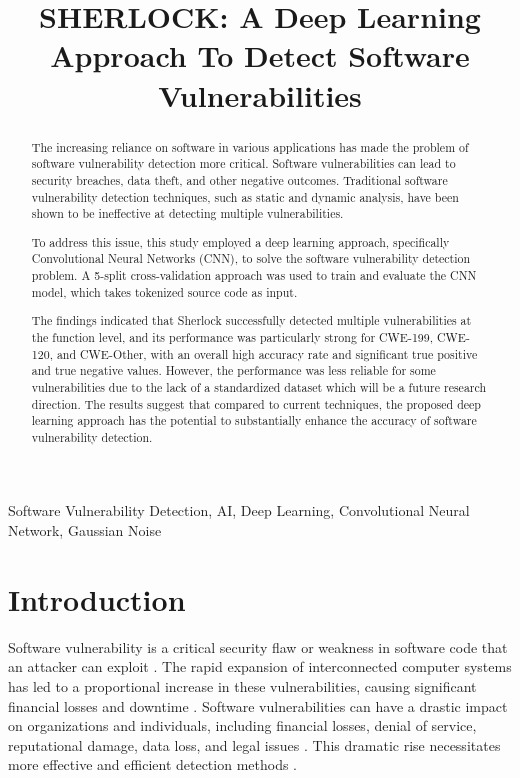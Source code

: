 \documentclass[conference]{IEEEtran}
\title{SHERLOCK: A Deep Learning Approach To Detect Software Vulnerabilities}
\author{
    \IEEEauthorblockN{Saadh Jawwadh}
    \IEEEauthorblockA{\textit{Informatics Institute of Technology} \\
    in collaboration with \textit{University of Westminster}\\
    Colombo, Sri Lanka \\}
    \and
    \IEEEauthorblockN{Guhanathan Poravi}
    \IEEEauthorblockA{\textit{Supervisor} \\
    \textit{Informatics Institute of Technology} \\
    Colombo, Sri Lanka}
}
\newcommand{\MYhyperreffix}{}
\let\MYhyperreffix\cite
\renewcommand{\cite}[1]{\MYhyperreffix{#1}}
\begin{document}
\maketitle
\thispagestyle{plain}
\pagestyle{plain}

\begin{abstract}
The increasing reliance on software in various applications has made the problem of software vulnerability detection more critical. Software vulnerabilities can lead to security breaches, data theft, and other negative outcomes. Traditional software vulnerability detection techniques, such as static and dynamic analysis, have been shown to be ineffective at detecting multiple vulnerabilities.

To address this issue, this study employed a deep learning approach, specifically Convolutional Neural Networks (CNN), to solve the software vulnerability detection problem. A 5-split cross-validation approach was used to train and evaluate the CNN model, which takes tokenized source code as input.

The findings indicated that Sherlock successfully detected multiple vulnerabilities at the function level, and its performance was particularly strong for CWE-199, CWE-120, and CWE-Other, with an overall high accuracy rate and significant true positive and true negative values. However, the performance was less reliable for some vulnerabilities due to the lack of a standardized dataset which will be a future research direction. The results suggest that compared to current techniques, the proposed deep learning approach has the potential to substantially enhance the accuracy of software vulnerability detection.
\end{abstract}

\begin{IEEEkeywords}
Software Vulnerability Detection, AI, Deep Learning, Convolutional Neural Network, Gaussian Noise
\end{IEEEkeywords}

\section{Introduction}
Software vulnerability is a critical security flaw or weakness in software code that an attacker can exploit \cite{hanif_rise_2021}. The rapid expansion of interconnected computer systems has led to a proportional increase in these vulnerabilities, causing significant financial losses and downtime \cite{hanif_rise_2021, skybox_security_vulnerability_2022, zero_day_initiative_zero_2023}. Software vulnerabilities can have a drastic impact on organizations and individuals, including financial losses, denial of service, reputational damage, data loss, and legal issues \cite{tomaschek_lastpass_2023, coker_lastpass_2023, aiyer_new_2022}. This dramatic rise necessitates more effective and efficient detection methods \cite{noauthor_state_2021}.
\end{document}
